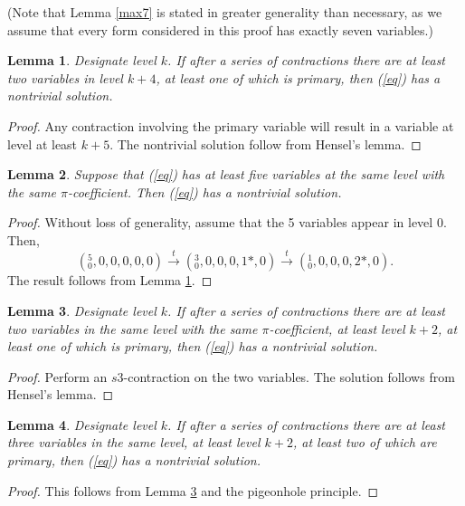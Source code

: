 \documentclass{article}
\newtheorem{lemma}{Lemma}
\begin{document}
(Note that Lemma \ref{max7} is stated in greater generality than necessary, as we assume that every form considered in this proof has exactly seven variables.)

\begin{lemma}\label{donefrom4}
Designate level $k$.  If after a series of contractions there are at least two variables in level $k+4$, at least one of which is primary, then (\ref{eq}) has a nontrivial solution.
\end{lemma}
\begin{proof}
Any contraction involving the primary variable will result in a variable at level at least $k+5$.  The nontrivial solution follow from Hensel's lemma.
\end{proof}

\begin{lemma} \label{max5same}
Suppose that (\ref{eq}) has at least five variables at the same level with the same $\pi$-coefficient.  Then (\ref{eq}) has a nontrivial solution.
\end{lemma}
\begin{proof}
Without loss of generality, assume that the 5 variables appear in level 0.  Then,
$$(^{5}_{0},0,0,0,0,0) \xrightarrow{t}
(^{3}_{0},0,0,0,1*,0) \xrightarrow{t}
(^{1}_{0},0,0,0,2*,0).$$
The result follows from Lemma \ref{donefrom4}.
\end{proof}

\begin{lemma} \label{donefrom2}
Designate level $k$.  If after a series of contractions there are at least two variables in the same level with the same $\pi$-coefficient, at least level $k+2$, at least one of which is primary, then (\ref{eq}) has a nontrivial solution.
\end{lemma}
\begin{proof}
Perform an $s3$-contraction on the two variables.  The solution follows from Hensel's lemma.
\end{proof}

\begin{lemma} \label{donefrom2with3}
Designate level $k$.  If after a series of contractions there are at least three variables in the same level, at least level $k+2$, at least two of which are primary, then (\ref{eq}) has a nontrivial solution.
\end{lemma}
\begin{proof}
This follows from Lemma \ref{donefrom2} and the pigeonhole principle.
\end{proof}
\end{document}
